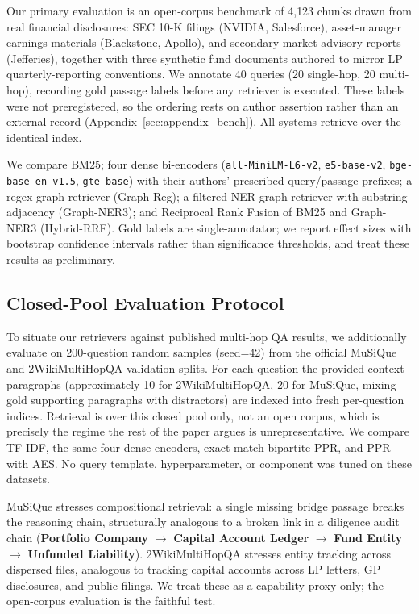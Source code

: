 \documentclass[runningheads]{llncs}
\begin{document}
Our primary evaluation is an open-corpus benchmark of 4{,}123 chunks drawn from real financial disclosures: SEC 10-K filings (NVIDIA, Salesforce), asset-manager earnings materials (Blackstone, Apollo), and secondary-market advisory reports (Jefferies), together with three synthetic fund documents authored to mirror LP quarterly-reporting conventions. We annotate 40 queries (20 single-hop, 20 multi-hop), recording gold passage labels before any retriever is executed. These labels were not preregistered, so the ordering rests on author assertion rather than an external record (Appendix~\ref{sec:appendix_bench}). All systems retrieve over the identical index.

We compare BM25; four dense bi-encoders (\texttt{all-MiniLM-L6-v2}, \texttt{e5-base-v2}, \texttt{bge-base-en-v1.5}, \texttt{gte-base}) with their authors' prescribed query/passage prefixes; a regex-graph retriever (Graph-Reg); a filtered-NER graph retriever with substring adjacency (Graph-NER3); and Reciprocal Rank Fusion of BM25 and Graph-NER3 (Hybrid-RRF). Gold labels are single-annotator; we report effect sizes with bootstrap confidence intervals rather than significance thresholds, and treat these results as preliminary.

\subsection{Closed-Pool Evaluation Protocol}

To situate our retrievers against published multi-hop QA results, we additionally evaluate on 200-question random samples (seed=42) from the official MuSiQue \cite{trivedi2022musique} and 2WikiMultiHopQA \cite{ho2020constructing} validation splits. For each question the provided context paragraphs (approximately 10 for 2WikiMultiHopQA, 20 for MuSiQue, mixing gold supporting paragraphs with distractors) are indexed into fresh per-question indices. Retrieval is over this closed pool only, not an open corpus, which is precisely the regime the rest of the paper argues is unrepresentative. We compare TF-IDF, the same four dense encoders, exact-match bipartite PPR, and PPR with AES. No query template, hyperparameter, or component was tuned on these datasets.

MuSiQue stresses compositional retrieval: a single missing bridge passage breaks the reasoning chain, structurally analogous to a broken link in a diligence audit chain (\textbf{Portfolio Company} $\rightarrow$ \textbf{Capital Account Ledger} $\rightarrow$ \textbf{Fund Entity} $\rightarrow$ \textbf{Unfunded Liability}). 2WikiMultiHopQA stresses entity tracking across dispersed files, analogous to tracking capital accounts across LP letters, GP disclosures, and public filings. We treat these as a capability proxy only; the open-corpus evaluation is the faithful test.
\end{document}
